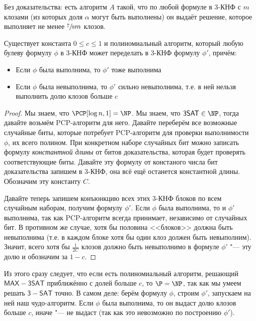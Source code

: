 	\begin{assertion}
		Без доказательства: есть алгоритм $A$ такой, что по любой формуле в 3-КНФ с $m$ клозами (из которых доля $\alpha$ могут быть выполнены)
		он выдаёт решение, которое выполняет не менее $\sfrac78 m$ клозов.
	\end{assertion}

	\begin{lemma}
		Существует константа $0 \le c \le 1$ и полиномиальный алгоритм, который любую булеву формулу $\phi$ в 3-КНФ может переделать в 3-КНФ формулу $\phi'$, причём:
		\begin{itemize}
			\item Если $\phi$ была выполнима, то $\phi'$ тоже выполнима
			\item Если $\phi$ была невыполнима, то $\phi'$ сильно невыполнима, т.е. в ней нельзя выполнить долю клозов больше $c$
		\end{itemize}
	\end{lemma}
	\begin{proof}
		Мы знаем, что $\PCP[\log n, 1] = \NP$.
		Мы знаем, что $\mathsf{3SAT} \in \NP$, тогда давайте возьмём PCP-алгоритм для него.
		Давайте переберём все возможные случайные биты, которые потребует PCP-алгоритм для проверки выполнимости $\phi$, их всего полином.
		При конкретном наборе случайных бит можно записать формулу \textit{константной длины} от битов доказательства, которая будет проверять соответствующие биты.
		Давайте эту формулу от констаного числа бит доказательства запишем в 3-КНФ, она всё ещё останется константной длины.
		Обозначим эту константу $C$.

		Давайте теперь запишем конъюнкцию всех этих 3-КНФ блоков по всем случайным наборам, получим формулу $\phi'$.
		Если $\phi$ была выполнима, то и $\phi'$ выполнима, так как PCP-алгоритм всегда принимает, независимо от случайных бит.
		В противном же случае, хотя бы половина <<блоков>> должна быть невыполнима (т.е. в каждом блоке хотя бы один клоз должен быть невыполним).
		Значит, всего хотя бы $\frac{1}{2C}$ клозов должно быть невыполнимо в формуле $\phi'$ "--- эту долю и обозначим за $1-c$.
	\end{proof}
	\begin{conseq}
		Из этого сразу следует, что если есть полиномиальный алгоритм, решающий $\mathsf{MAX-3SAT}$ приближённо с долей больше $c$, то $\P=\NP$, так как мы умеем решать $\mathsf{3-SAT}$ точно.
		В самом деле: берём формулу $\phi$, строим $\phi'$, запускаем на ней наш чудо-алгоритм.
		Если $\phi$ была выполнима, то он выдаст долю клозов больше $c$, иначе "--- не выдаст (так как это невозможно по построению $\phi'$).
	\end{conseq}
